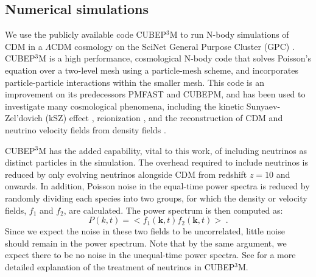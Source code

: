 \documentclass{aastex}
\begin{document}
\subsection{Numerical simulations}
\label{sec:Numerics}

We use the publicly available code CUBEP$^3$M
\citep{harnois12} 
to run N-body simulations of CDM in a $\Lambda$CDM
cosmology on the SciNet General Purpose Cluster (GPC) \citep{GPC}.
CUBEP$^3$M is a high performance, cosmological N-body
code that
solves Poisson's equation over a two-level mesh using a particle-mesh
scheme, and incorporates particle-particle interactions within the
smaller mesh.  This code is an improvement on its predecessors 
PMFAST \citep{merz05}
and CUBEPM, and has been used to investigate many cosmological
phenomena, 
including 
the kinetic Sunyaev-Zel'dovich (kSZ) effect  \citep{park13,park15},
reionization \citep{iliev14,majumdar14}, and the 
reconstruction of CDM and neutrino velocity fields from density fields
\citep{inman15}.

CUBEP$^3$M has the added capability, vital to this work, of including
neutrinos as distinct particles in the simulation.  The
overhead required to include neutrinos is reduced by only evolving
neutrinos alongside CDM from redshift $z=10$ and
onwards.
In addition, Poisson noise in the equal-time power spectra is reduced
by randomly dividing each species into two groups, for which the
density or velocity fields, $f_1$ and $f_2$, are calculated.  
The power spectrum is
then computed as:
\begin{equation}
  P(k,t) = < f_1(\mathbf{k},t) f_2(\mathbf{k},t) > \;.
\end{equation}
Since we expect the noise in these two fields to be uncorrelated,
little noise should remain in the power spectrum.  Note that by the
same argument, we expect there to be no noise in the unequal-time
power spectra.
See \cite{inman15} for a more detailed explanation of the
treatment of neutrinos in CUBEP$^{3}$M.
\end{document}

